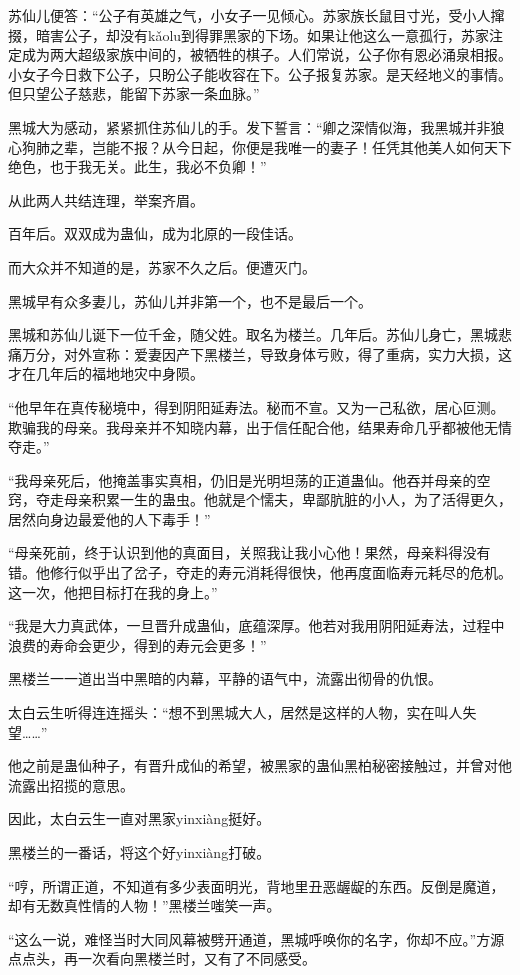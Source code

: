 \begin{this_body}
苏仙儿便答：“公子有英雄之气，小女子一见倾心。苏家族长鼠目寸光，受小人撺掇，暗害公子，却没有kǎolu到得罪黑家的下场。如果让他这么一意孤行，苏家注定成为两大超级家族中间的，被牺牲的棋子。人们常说，公子你有恩必涌泉相报。小女子今日救下公子，只盼公子能收容在下。公子报复苏家。是天经地义的事情。但只望公子慈悲，能留下苏家一条血脉。”

黑城大为感动，紧紧抓住苏仙儿的手。发下誓言：“卿之深情似海，我黑城并非狼心狗肺之辈，岂能不报？从今日起，你便是我唯一的妻子！任凭其他美人如何天下绝色，也于我无关。此生，我必不负卿！”

从此两人共结连理，举案齐眉。

百年后。双双成为蛊仙，成为北原的一段佳话。

而大众并不知道的是，苏家不久之后。便遭灭门。

黑城早有众多妻儿，苏仙儿并非第一个，也不是最后一个。

黑城和苏仙儿诞下一位千金，随父姓。取名为楼兰。几年后。苏仙儿身亡，黑城悲痛万分，对外宣称：爱妻因产下黑楼兰，导致身体亏败，得了重病，实力大损，这才在几年后的福地地灾中身陨。

“他早年在真传秘境中，得到阴阳延寿法。秘而不宣。又为一己私欲，居心叵测。欺骗我的母亲。我母亲并不知晓内幕，出于信任配合他，结果寿命几乎都被他无情夺走。”

“我母亲死后，他掩盖事实真相，仍旧是光明坦荡的正道蛊仙。他吞并母亲的空窍，夺走母亲积累一生的蛊虫。他就是个懦夫，卑鄙肮脏的小人，为了活得更久，居然向身边最爱他的人下毒手！”

“母亲死前，终于认识到他的真面目，关照我让我小心他！果然，母亲料得没有错。他修行似乎出了岔子，夺走的寿元消耗得很快，他再度面临寿元耗尽的危机。这一次，他把目标打在我的身上。”

“我是大力真武体，一旦晋升成蛊仙，底蕴深厚。他若对我用阴阳延寿法，过程中浪费的寿命会更少，得到的寿元会更多！”

黑楼兰一一道出当中黑暗的内幕，平静的语气中，流露出彻骨的仇恨。

太白云生听得连连摇头：“想不到黑城大人，居然是这样的人物，实在叫人失望……”

他之前是蛊仙种子，有晋升成仙的希望，被黑家的蛊仙黑柏秘密接触过，并曾对他流露出招揽的意思。

因此，太白云生一直对黑家yinxiàng挺好。

黑楼兰的一番话，将这个好yinxiàng打破。

“哼，所谓正道，不知道有多少表面明光，背地里丑恶龌龊的东西。反倒是魔道，却有无数真性情的人物！”黑楼兰嗤笑一声。

“这么一说，难怪当时大同风幕被劈开通道，黑城呼唤你的名字，你却不应。”方源点点头，再一次看向黑楼兰时，又有了不同感受。


\end{this_body}
